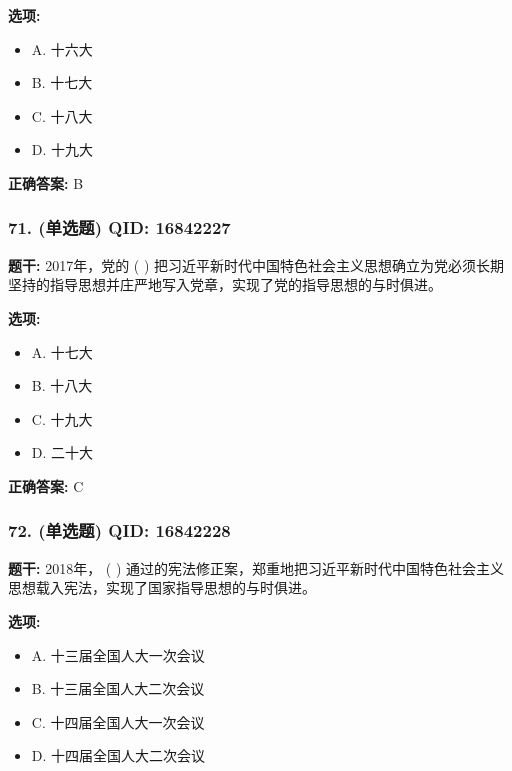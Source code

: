 \documentclass[12pt,UTF8]{ctexart}
\begin{document}
\textbf{选项:}
\begin{itemize}[leftmargin=*]

  \item A. 十六大

  \item B. 十七大

  \item C. 十八大

  \item D. 十九大

\end{itemize}

\textbf{正确答案:}
B

\vspace{0.3em}\hrulefill\vspace{0.7em}

\subsubsection*{71. (单选题) \small QID: 16842227}

\textbf{题干:}
2017年，党的 ( ) 把习近平新时代中国特色社会主义思想确立为党必须长期坚持的指导思想并庄严地写入党章，实现了党的指导思想的与时俱进。

\textbf{选项:}
\begin{itemize}[leftmargin=*]

  \item A. 十七大

  \item B. 十八大

  \item C. 十九大

  \item D. 二十大

\end{itemize}

\textbf{正确答案:}
C

\vspace{0.3em}\hrulefill\vspace{0.7em}

\subsubsection*{72. (单选题) \small QID: 16842228}

\textbf{题干:}
2018年， ( ) 通过的宪法修正案，郑重地把习近平新时代中国特色社会主义思想载入宪法，实现了国家指导思想的与时俱进。

\textbf{选项:}
\begin{itemize}[leftmargin=*]

  \item A. 十三届全国人大一次会议

  \item B. 十三届全国人大二次会议

  \item C. 十四届全国人大一次会议

  \item D. 十四届全国人大二次会议

\end{itemize}
\end{document}
